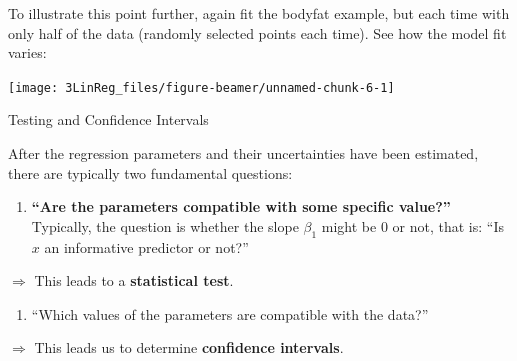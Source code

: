 \documentclass[10pt,ignorenonframetext,]{beamer}
\providecommand{\tightlist}{%
  \setlength{\itemsep}{0pt}\setlength{\parskip}{0pt}}
\begin{document}
\begin{frame}

To illustrate this point further, again fit the bodyfat example, but
each time with only half of the data (randomly selected points each
time). See how the model fit varies:

\begin{center}\texttt{[image: 3LinReg\_files/figure-beamer/unnamed-chunk-6-1]} \end{center}

\end{frame}

\begin{frame}{Testing and Confidence Intervals}

After the regression parameters and their uncertainties have been
estimated, there are typically two fundamental questions: \(~\)

\begin{enumerate}
\def\labelenumi{\arabic{enumi}.}
\tightlist
\item
  \textbf{``Are the parameters compatible with some specific value?''}
  Typically, the question is whether the slope \(\beta_1\) might be 0 or
  not, that is: ``Is \(x\) an informative predictor or not?''
\end{enumerate}

\(\Rightarrow\) This leads to a \textbf{statistical test}.

\vspace{4mm}

\begin{enumerate}
\def\labelenumi{\arabic{enumi}.}
\setcounter{enumi}{1}
\tightlist
\item
  ``Which values of the parameters are compatible with the data?''
\end{enumerate}

\(\Rightarrow\) This leads us to determine \textbf{confidence
intervals}.

\end{frame}
\end{document}
